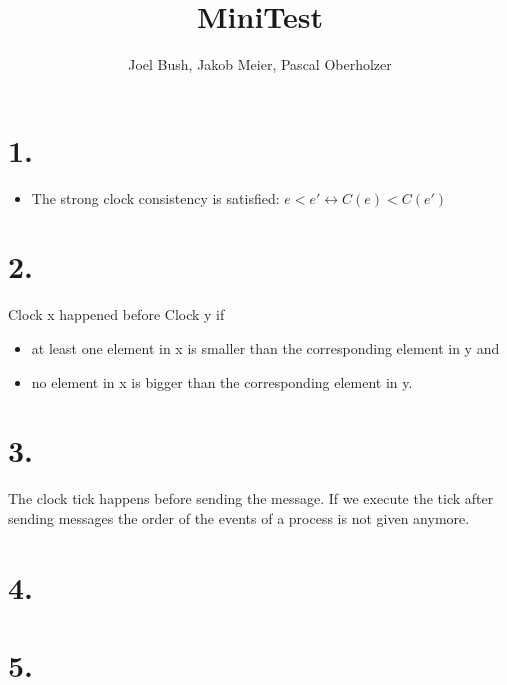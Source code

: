 \documentclass[10pt,a4paper]{article}
\author{Joel Bush, Jakob Meier, Pascal Oberholzer}
\title{MiniTest}
\begin{document}
	\maketitle
	
	\section*{1.}
		\begin{itemize}
			\item The strong clock consistency is satisfied: $e < e' \leftrightarrow C \left( e \right) < C \left( e' \right)$
		\end{itemize}
	
	\section*{2.}
		Clock x happened  before Clock y if
		\begin{itemize}
			\item at least one element in x is smaller than the corresponding element in y and
			\item no element in x is bigger than the corresponding element in y.
		\end{itemize}
	
	\section*{3.}
		The clock tick happens before sending the message. If we execute the tick after sending messages the order of the events of a process is not given anymore.
	
	\section*{4.}
	
	\section*{5.}
	
\end{document}
